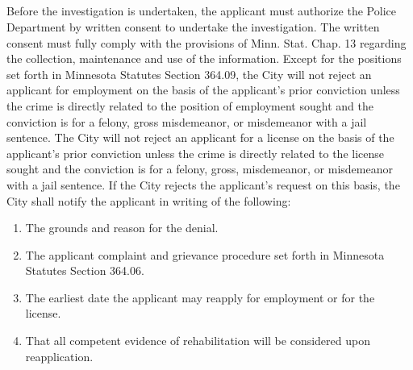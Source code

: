 \subsection{}
Before the investigation is undertaken, the applicant must authorize the Police Department by written consent to undertake the investigation. The written consent must fully comply with the provisions of Minn. Stat. Chap. 13 regarding the collection, maintenance and use of the information. Except for the positions set forth in Minnesota Statutes Section 364.09, the City will not reject an applicant for employment on the basis of the applicant’s prior conviction unless the crime is directly related to the position of employment sought and the conviction is for a felony, gross misdemeanor, or misdemeanor with a jail sentence. The City will not reject an applicant for a license on the basis of the applicant’s prior conviction unless the crime is directly related to the license sought and the conviction is for a felony, gross, misdemeanor, or misdemeanor with a jail sentence. If the City rejects the applicant’s request on this basis, the City shall notify the applicant in writing of the following:
\begin{enumerate}[{\indent}1)]
    \item The grounds and reason for the denial.
    \item The applicant complaint and grievance procedure set forth in Minnesota Statutes Section 364.06.
    \item The earliest date the applicant may reapply for employment or for the license.
    \item That all competent evidence of rehabilitation will be considered upon reapplication.
\end{enumerate}
